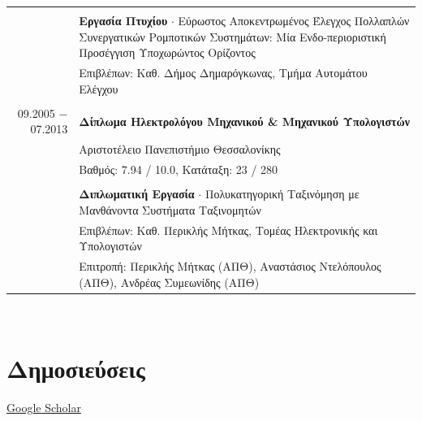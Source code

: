 \documentclass[a4paper,10pt,twoside]{article}
\begin{document}
\begin{tabular}{rp{11cm}}
&\\                 & \textbf{Εργασία Πτυχίου} $\cdot$ Εύρωστος Αποκεντρωμένος Έλεγχος Πολλαπλών Συνεργατικών Ρομποτικών Συστημάτων: Μία Ενδο-περιοριστική
                      Προσέγγιση Υποχωρώντος Ορίζοντος \\
                    & Επιβλέπων: Καθ. Δήμος Δημαρόγκωνας, Τμήμα Αυτομάτου Ελέγχου\\
&\\
09.2005 $-$ 07.2013 & \textbf{Δίπλωμα Ηλεκτρολόγου Μηχανικού \& Μηχανικού Υπολογιστών} \\
                    & Αριστοτέλειο Πανεπιστήμιο Θεσσαλονίκης \\
                    & Βαθμός: 7.94 / 10.0, Κατάταξη: 23 / 280 \\
&\\
                    & \textbf{Διπλωματική Εργασία} $\cdot$ Πολυκατηγορική Ταξινόμηση με Μανθάνοντα Συστήματα Ταξινομητών\\
                    & Επιβλέπων: Καθ. Περικλής Μήτκας, Τομέας Ηλεκτρονικής και Υπολογιστών\\
                    & Επιτροπή: Περικλής Μήτκας (ΑΠΘ), Αναστάσιος Ντελόπουλος (ΑΠΘ), Ανδρέας Συμεωνίδης (ΑΠΘ) \\
\end{tabular}\\
\vspace*{\fill}
\newpage

\section{Δημοσιεύσεις}

\href{https://scholar.google.com/citations?view\_op=list\_works\&hl=en\&user=9\_hI4hMAAAAJ}{Google Scholar}\\
\end{document}
